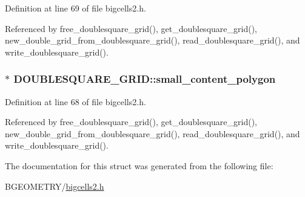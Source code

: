 Definition at line 69 of file bigcells2.\-h.



Referenced by free\-\_\-doublesquare\-\_\-grid(), get\-\_\-doublesquare\-\_\-grid(), new\-\_\-double\-\_\-grid\-\_\-from\-\_\-doublesquare\-\_\-grid(), read\-\_\-doublesquare\-\_\-grid(), and write\-\_\-doublesquare\-\_\-grid().

\hypertarget{struct_d_o_u_b_l_e_s_q_u_a_r_e___g_r_i_d_a7edbcfb3ad0fbc98dbaea66ba5ba7587}{
\subsubsection[{small\-\_\-content\-\_\-polygon}]{$\ast$ D\-O\-U\-B\-L\-E\-S\-Q\-U\-A\-R\-E\-\_\-\-G\-R\-I\-D\-::small\-\_\-content\-\_\-polygon}}\label{struct_d_o_u_b_l_e_s_q_u_a_r_e___g_r_i_d_a7edbcfb3ad0fbc98dbaea66ba5ba7587}


Definition at line 68 of file bigcells2.\-h.



Referenced by free\-\_\-doublesquare\-\_\-grid(), get\-\_\-doublesquare\-\_\-grid(), new\-\_\-double\-\_\-grid\-\_\-from\-\_\-doublesquare\-\_\-grid(), read\-\_\-doublesquare\-\_\-grid(), and write\-\_\-doublesquare\-\_\-grid().



The documentation for this struct was generated from the following file\-:\begin{DoxyCompactItemize}
\item 
B\-G\-E\-O\-M\-E\-T\-R\-Y/\hyperlink{bigcells2_8h}{bigcells2.\-h}\end{DoxyCompactItemize}
